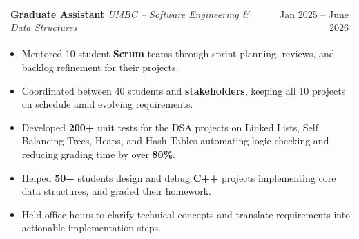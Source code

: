 \documentclass[letterpaper,11pt]{article}
\makeatletter
\newcommand{\SectionListEnd}{\end{itemize}}
\newcommand{\BulletItems}[1]{
  \item
    \begin{itemize}[label={-}, leftmargin=*, labelsep=0.3em, topsep=0pt, partopsep=0pt, itemsep=0pt, parsep=0pt]
      \small #1
    \end{itemize}\vspace{-5pt}
}
\newcommand{\SLSubheadingItemThF}[3]{
  \vspace{-2pt}\item
    \begin{tabular*}{0.97\textwidth}[t]{l@{\extracolsep{\fill}}r}
      \textbf{#1} \textbar{} \textit{\small #2} & {\small #3} \\
    \end{tabular*}\vspace{-7pt}
}
\makeatother
\begin{document}
    \SLSubheadingItemThF
      {Graduate Assistant}
      {UMBC -- Software Engineering \& Data Structures}
      {Jan 2025 -- June 2026}
    \BulletItems{
      \item Mentored 10 student \textbf{Scrum} teams through sprint planning, reviews, and backlog refinement for their projects.
      \item Coordinated between 40 students and \textbf{stakeholders}, keeping all 10 projects on schedule amid evolving requirements.
      \item Developed \textbf{200+} unit tests for the DSA projects on Linked Lists, Self Balancing Trees, Heaps, and Hash Tables automating logic checking and reducing grading time by over \textbf{80\%}.
      \item Helped \textbf{50+} students design and debug \textbf{C++} projects implementing core data structures, and graded their homework.
      \item Held office hours to clarify technical concepts and translate requirements into actionable implementation steps.
      }

\end{document}
